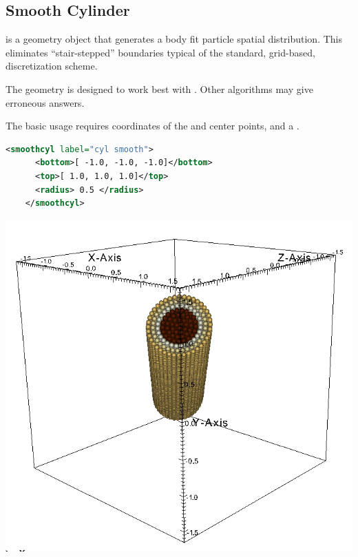 \subsection{Smooth Cylinder}
\begin{minipage}{0.6\textwidth}
   is a geometry object that generates a body fit particle spatial
  distribution.  This eliminates ``stair-stepped'' boundaries typical of
  the standard, grid-based, discretization scheme.  
  \begin{NoteBox}
    The  geometry is designed to work best with
    . Other
    algorithms may give erroneous answers.
  \end{NoteBox}

  The basic usage requires coordinates of the  and 
  center points, and a .
  \begin{lstlisting}[language=XML]
    <smoothcyl label="cyl smooth">
      <bottom>[ -1.0, -1.0, -1.0]</bottom>
      <top>[ 1.0, 1.0, 1.0]</top>
      <radius> 0.5 </radius>
    </smoothcyl>
  \end{lstlisting}
\end{minipage}
\begin{minipage}{0.4\textwidth}
  \centering
  \includegraphics[width=0.9\columnwidth]{FIGS/geometry/geom_smooth_cyl_solid.png}
\end{minipage}

